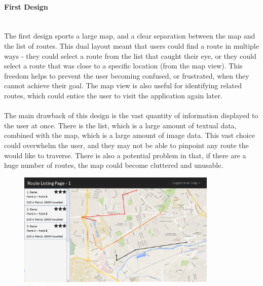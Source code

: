 \documentclass[a4paper,twoside,notitlepage,11pt]{article}
\begin{document}
\paragraph{First Design}\ \\
The first design sports a large map, and a clear separation between the map and the list of routes. This dual layout meant that users could find a route in multiple ways - they could select a route from the list that caught their eye, or they could select a route that was close to a specific location (from the map view). This freedom helps to prevent the user becoming confused, or frustrated, when they cannot achieve their goal. The map view is also useful for identifying related routes, which could entice the user to visit the application again later.\ \\
\ \\
The main drawback of this design is the vast quantity of information displayed to the user at once. There is the list, which is a large amount of textual data, combined with the map, which is a large amount of image data. This vast choice could overwhelm the user, and they may not be able to pinpoint any route the would like to traverse. There is also a potential problem in that, if there are a huge number of routes, the map could become cluttered and unusable.
\begin{figure}[!ht]
\vspace{6mm}
	\begin{center}
		\includegraphics[width=0.85\textwidth]{images/ui-rlp-1.png}
	\end{center}
	\vspace{-6mm}
\end{figure}

\newpage 
\end{document}
